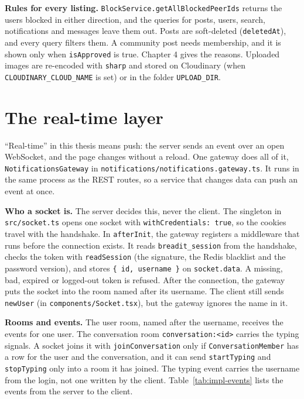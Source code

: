 \textbf{Rules for every listing.} \texttt{BlockService.getAllBlockedPeerIds} returns the users blocked in either direction, and the queries for posts, users, search, notifications and messages leave them out. Posts are soft-deleted (\texttt{deletedAt}), and every query filters them. A community post needs membership, and it is shown only when \texttt{isApproved} is true. Chapter 4 gives the reasons. Uploaded images are re-encoded with \texttt{sharp} and stored on Cloudinary (when \texttt{CLOUDINARY\_CLOUD\_NAME} is set) or in the folder \texttt{UPLOAD\_DIR}.

\section{The real-time layer}
\label{sec:impl-realtime}

``Real-time'' in this thesis means push: the server sends an event over an open WebSocket, and the page changes without a reload. One gateway does all of it, \texttt{NotificationsGateway} in \texttt{notifications/notifications.gateway.ts}. It runs in the same process as the REST routes, so a service that changes data can push an event at once.

\textbf{Who a socket is.} The server decides this, never the client. The singleton in \texttt{src/socket.ts} opens one socket with \texttt{withCredentials: true}, so the cookies travel with the handshake. In \texttt{afterInit}, the gateway registers a middleware that runs before the connection exists. It reads \texttt{breadit\_session} from the handshake, checks the token with \texttt{readSession} (the signature, the Redis blacklist and the password version), and stores \texttt{\{ id, username \}} on \texttt{socket.data}. A missing, bad, expired or logged-out token is refused. After the connection, the gateway puts the socket into the room named after its username. The client still sends \texttt{newUser} (in \texttt{components/Socket.tsx}), but the gateway ignores the name in it.

\textbf{Rooms and events.} The user room, named after the username, receives the events for one user. The conversation room \texttt{conversation:<id>} carries the typing signals. A socket joins it with \texttt{joinConversation} only if \texttt{ConversationMember} has a row for the user and the conversation, and it can send \texttt{startTyping} and \texttt{stopTyping} only into a room it has joined. The typing event carries the username from the login, not one written by the client. Table~\ref{tab:impl-events} lists the events from the server to the client.

